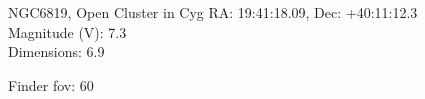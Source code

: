 \begin{block}{NGC6819, Open Cluster in Cyg}
    RA: 19:41:18.09, Dec: +40:11:12.3 \\ 
    Magnitude (V): 7.3 \\ 
    Dimensions: 6.9 

    Finder fov: 60 
\end{block}
